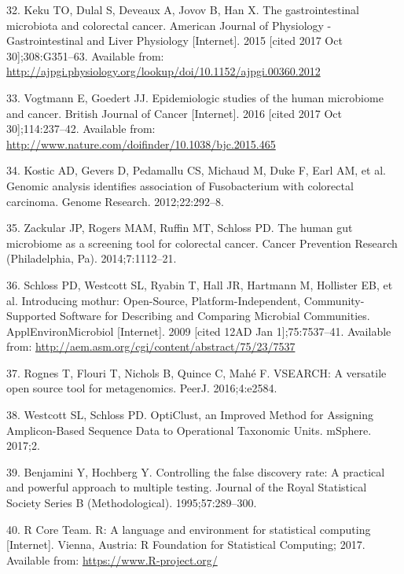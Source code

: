 \documentclass[12pt,]{article}
\begin{document}
\hypertarget{ref-keku_gastrointestinal_2015}{}
32. Keku TO, Dulal S, Deveaux A, Jovov B, Han X. The gastrointestinal
microbiota and colorectal cancer. American Journal of Physiology -
Gastrointestinal and Liver Physiology {[}Internet{]}. 2015 {[}cited 2017
Oct 30{]};308:G351--63. Available from:
\url{http://ajpgi.physiology.org/lookup/doi/10.1152/ajpgi.00360.2012}

\hypertarget{ref-vogtmann_epidemiologic_2016}{}
33. Vogtmann E, Goedert JJ. Epidemiologic studies of the human
microbiome and cancer. British Journal of Cancer {[}Internet{]}. 2016
{[}cited 2017 Oct 30{]};114:237--42. Available from:
\url{http://www.nature.com/doifinder/10.1038/bjc.2015.465}

\hypertarget{ref-kostic_genomic_2012}{}
34. Kostic AD, Gevers D, Pedamallu CS, Michaud M, Duke F, Earl AM, et
al. Genomic analysis identifies association of Fusobacterium with
colorectal carcinoma. Genome Research. 2012;22:292--8.

\hypertarget{ref-zackular_human_2014}{}
35. Zackular JP, Rogers MAM, Ruffin MT, Schloss PD. The human gut
microbiome as a screening tool for colorectal cancer. Cancer Prevention
Research (Philadelphia, Pa). 2014;7:1112--21.

\hypertarget{ref-schloss_introducing_2009}{}
36. Schloss PD, Westcott SL, Ryabin T, Hall JR, Hartmann M, Hollister
EB, et al. Introducing mothur: Open-Source, Platform-Independent,
Community-Supported Software for Describing and Comparing Microbial
Communities. ApplEnvironMicrobiol {[}Internet{]}. 2009 {[}cited 12AD Jan
1{]};75:7537--41. Available from:
\url{http://aem.asm.org/cgi/content/abstract/75/23/7537}

\hypertarget{ref-rognes_vsearch_2016}{}
37. Rognes T, Flouri T, Nichols B, Quince C, Mahé F. VSEARCH: A
versatile open source tool for metagenomics. PeerJ. 2016;4:e2584.

\hypertarget{ref-westcott_opticlust_2017}{}
38. Westcott SL, Schloss PD. OptiClust, an Improved Method for Assigning
Amplicon-Based Sequence Data to Operational Taxonomic Units. mSphere.
2017;2.

\hypertarget{ref-benjamini_controlling_1995}{}
39. Benjamini Y, Hochberg Y. Controlling the false discovery rate: A
practical and powerful approach to multiple testing. Journal of the
Royal Statistical Society Series B (Methodological). 1995;57:289--300.

\hypertarget{ref-r_citation_2017}{}
40. R Core Team. R: A language and environment for statistical computing
{[}Internet{]}. Vienna, Austria: R Foundation for Statistical Computing;
2017. Available from: \url{https://www.R-project.org/}
\end{document}

